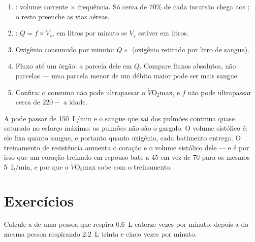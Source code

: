 \begin{method}\label{met:g10:heart-lungs-effort:compute}
\begin{enumerate}
  \item {}: volume corrente $\times$ frequência. Só cerca de
        70\% de cada incursão chega aos ; o resto preenche as
        vias aéreas.
  \item {}: $Q = f \times V_s$, em litros por minuto se
        $V_s$ estiver em litros.
  \item Oxigênio consumido por minuto: $Q \times$ (oxigênio retirado
        por litro de sangue).
  \item Fluxo até um órgão: a parcela dele em $Q$. Compare fluxos
        absolutos, não parcelas --- uma parcela menor de um débito
        maior pode ser mais sangue.
  \item Confira: o consumo não pode ultrapassar o
        $\dot V\!\mathrm{O_2}$max, e $f$ não pode ultrapassar cerca de
        $220 - $ a idade.
\end{enumerate}
\end{method}

\begin{remark}\label{rem:g10:heart-lungs-effort:limit}
A  pode passar de \qty{150}{L/min} e o sangue que sai dos
pulmões continua quase saturado no esforço máximo: os pulmões não são o
gargalo. O volume sistólico é: ele fixa quanto sangue, e portanto
quanto oxigênio, cada batimento entrega. O treinamento de resistência
aumenta o coração e o volume sistólico dele --- e é por isso que um
coração treinado em repouso bate a 45 em vez de 70 para os mesmos
\qty{5}{L/min}, e por que o $\dot V\!\mathrm{O_2}$max sobe com o
treinamento.
\end{remark}

\section{Exercícios}

\begin{exercise}[$\star$]\label{exo:g10:heart-lungs-effort:1}
Calcule a  de uma pessoa que respira \qty{0.6}{L} catorze
vezes por minuto; depois a da mesma pessoa respirando \qty{2.2}{L}
trinta e cinco vezes por minuto.
\end{exercise}

